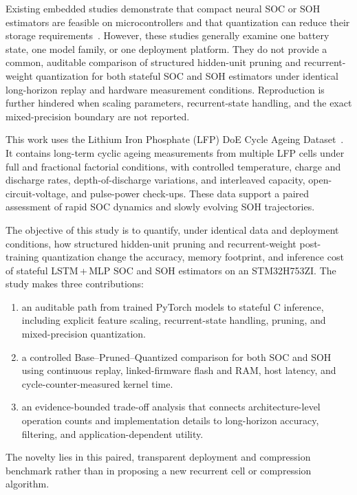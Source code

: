 \documentclass[final,3p,times]{elsarticle}
\begin{document}
Existing embedded studies demonstrate that compact neural SOC or SOH estimators are feasible on microcontrollers and that quantization can reduce their storage requirements~\cite{crocioniLiIonBatteriesParameter2020,giazitzisCaseStudyTiny2024,Embedded_AI_only_SOC_mobile,Embedded_AI_SOH_badData,naguibMicroprocessorExecutionTime2022}. However, these studies generally examine one battery state, one model family, or one deployment platform. They do not provide a common, auditable comparison of structured hidden-unit pruning and recurrent-weight quantization for both stateful SOC and SOH estimators under identical long-horizon replay and hardware measurement conditions. Reproduction is further hindered when scaling parameters, recurrent-state handling, and the exact mixed-precision boundary are not reported.

This work uses the Lithium Iron Phosphate (LFP) DoE Cycle Ageing Dataset~\cite{LFP_DoE_Cycle_Aging_Dataset}. It contains long-term cyclic ageing measurements from multiple LFP cells under full and fractional factorial conditions, with controlled temperature, charge and discharge rates, depth-of-discharge variations, and interleaved capacity, open-circuit-voltage, and pulse-power check-ups. These data support a paired assessment of rapid SOC dynamics and slowly evolving SOH trajectories.

The objective of this study is to quantify, under identical data and deployment conditions, how structured hidden-unit pruning and recurrent-weight post-training quantization change the accuracy, memory footprint, and inference cost of stateful LSTM\,+\,MLP SOC and SOH estimators on an STM32H753ZI. The study makes three contributions:
\begin{enumerate}[label=(\roman*),leftmargin=*,nosep]
    \item an auditable path from trained PyTorch models to stateful C inference, including explicit feature scaling, recurrent-state handling, pruning, and mixed-precision quantization.
    \item a controlled Base--Pruned--Quantized comparison for both SOC and SOH using continuous replay, linked-firmware flash and RAM, host latency, and cycle-counter-measured kernel time.
    \item an evidence-bounded trade-off analysis that connects architecture-level operation counts and implementation details to long-horizon accuracy, filtering, and application-dependent utility.
\end{enumerate}
The novelty lies in this paired, transparent deployment and compression benchmark rather than in proposing a new recurrent cell or compression algorithm.
\end{document}
